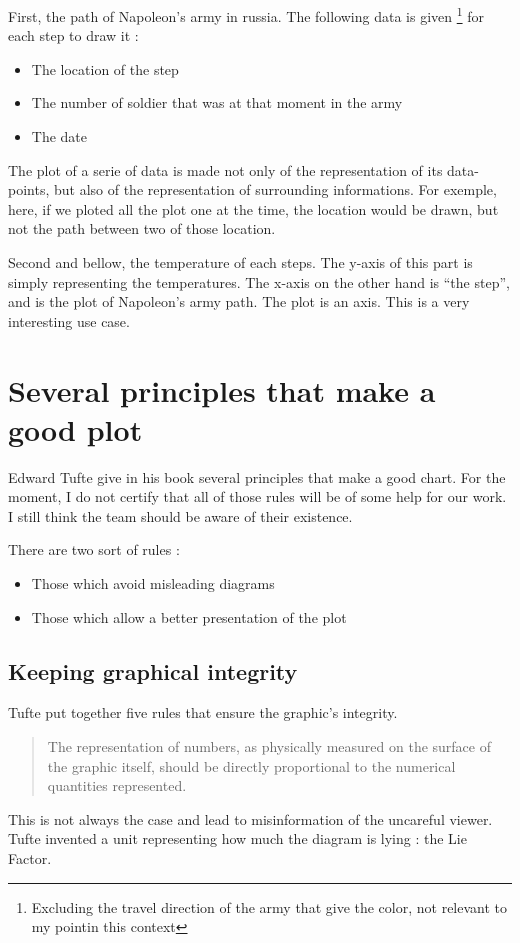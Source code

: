 First, the path of Napoleon's army in russia. The following data is given 
\footnote{Excluding the travel direction of the army that give the color, not relevant to my pointin this context}
 for each step to draw it :
\begin{itemize}
\item The location of the step
\item The number of soldier that was at that moment in the army
\item The date 
\end{itemize}

The plot of a serie of data is made not only of the representation of its data-points, but also of the representation of surrounding informations.
 For exemple, here, if we ploted all the plot one at the time, the location would be drawn, but not the path between two of those location.

Second and bellow, the temperature of each steps.
 The y-axis of this part is simply representing the temperatures.
 The x-axis on the other hand is ``the step'', and is the plot of Napoleon's army path. The plot is an axis. This is a very interesting use case.

\section{Several principles that make a good plot}
Edward Tufte give in his book several principles that make a good chart. For the moment, I do not certify that all of those rules will be of some help for our work. I still think the team should be aware of their existence.

There are two sort of rules : \begin{itemize}
\item Those which avoid misleading diagrams  
\item Those which allow a better presentation of the plot
\end{itemize}

\subsection{Keeping graphical integrity} 
Tufte put together five rules that ensure the graphic's integrity.

\hrulefill

\begin{quote}
The representation of numbers, as physically measured on the surface of the graphic itself, should be directly proportional to the numerical quantities represented.
\end{quote}
This is not always the case and lead to misinformation of the uncareful viewer. Tufte invented a unit representing how much the diagram is lying : the Lie Factor.

